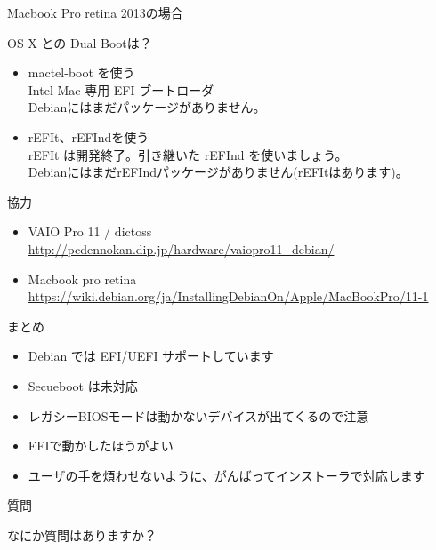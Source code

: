 \begin{frame}[containsverbatim]{Macbook Pro retina 2013の場合}

OS X との Dual Bootは？
\begin{itemize}
\item mactel-boot を使う \\
  Intel Mac 専用 EFI ブートローダ\\
  Debianにはまだパッケージがありません。
\item rEFIt、rEFIndを使う \\
  rEFIt は開発終了。引き継いた rEFInd を使いましょう。\\
  DebianにはまだrEFIndパッケージがありません(rEFItはあります)。
\end{itemize}
\end{frame}

\begin{frame}[containsverbatim]{協力}
\begin{itemize}
\item VAIO Pro 11 / dictoss \\
\url{http://pcdennokan.dip.jp/hardware/vaiopro11_debian/}
\item Macbook pro retina \\
\url{https://wiki.debian.org/ja/InstallingDebianOn/Apple/MacBookPro/11-1}
\end{itemize}
\end{frame}

\begin{frame}[containsverbatim]{まとめ}

\begin{itemize}
\item Debian では EFI/UEFI サポートしています
\item Secueboot は未対応
\item レガシーBIOSモードは動かないデバイスが出てくるので注意
\item EFIで動かしたほうがよい
\item ユーザの手を煩わせないように、がんばってインストーラで対応します
\end{itemize}

\end{frame}

\begin{frame}[containsverbatim]{質問}

\begin{center}
なにか質問はありますか？
\end{center}

\end{frame}

